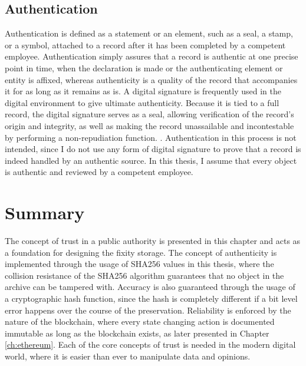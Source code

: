 \subsection{Authentication}
Authentication is defined as a statement or an element, such as a seal, a stamp, or a symbol, attached to a record after it has been completed by a competent employee. Authentication simply assures that a record is authentic at one precise point in time, when the declaration is made or the authenticating element or entity is affixed, whereas authenticity is a quality of the record that accompanies it for as long as it remains as is. A digital signature is frequently used in the digital environment to give ultimate authenticity. Because it is tied to a full record, the digital signature serves as a seal, allowing verification of the record's origin and integrity, as well as making the record unassailable and incontestable by performing a non-repudiation function. \cite[53]{duranti2009digital}.
Authentication in this process is not intended, since I do not use any form of digital signature to prove that a record is indeed handled by an authentic source. In this thesis, I assume that every object is authentic and reviewed by a competent employee.

\section{Summary}
The concept of trust in a public authority is presented in this chapter and acts as a foundation for designing the fixity storage. The concept of authenticity is implemented through the usage of SHA256 values in this thesis, where the collision resistance of the SHA256 algorithm guarantees that no object in the archive can be tampered with. Accuracy is also guaranteed through the usage of a cryptographic hash function, since the hash is completely different if a bit level error happens over the course of the preservation.
Reliability is enforced by the nature of the blockchain, where every state changing action is documented immutable as long as the blockchain exists, as later presented in Chapter \ref{ch:ethereum}. Each of the core concepts of trust is needed in the modern digital world, where it is easier than ever to manipulate data and opinions.